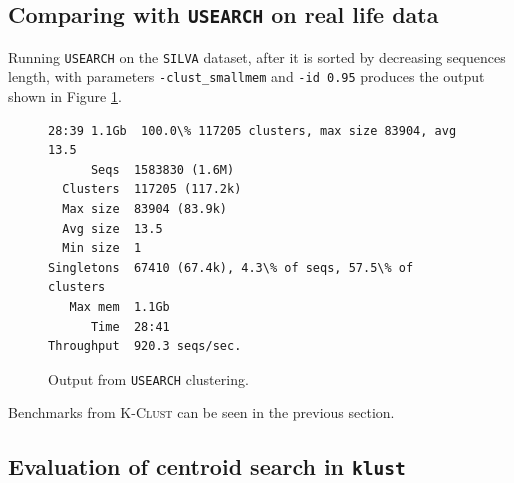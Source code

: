 \subsection{Comparing with \texttt{USEARCH} on real life data}
Running \texttt{USEARCH} on the \texttt{SILVA} dataset, after it is sorted by
decreasing sequences length, with parameters \texttt{-clust\_smallmem} and
\texttt{-id 0.95} produces the output shown in Figure \ref{fig:uclust_silva}.

\begin{figure}[H]
\begin{lstlisting}[style=output-style]
28:39 1.1Gb  100.0\% 117205 clusters, max size 83904, avg 13.5
      Seqs  1583830 (1.6M)
  Clusters  117205 (117.2k)
  Max size  83904 (83.9k)
  Avg size  13.5
  Min size  1
Singletons  67410 (67.4k), 4.3\% of seqs, 57.5\% of clusters
   Max mem  1.1Gb
      Time  28:41
Throughput  920.3 seqs/sec.
\end{lstlisting}
\caption{Output from \texttt{USEARCH} clustering.}
\label{fig:uclust_silva}
\end{figure}

Benchmarks from \textsc{K-Clust} can be seen in the previous section.







\subsection{Evaluation of centroid search in \texttt{klust}}

